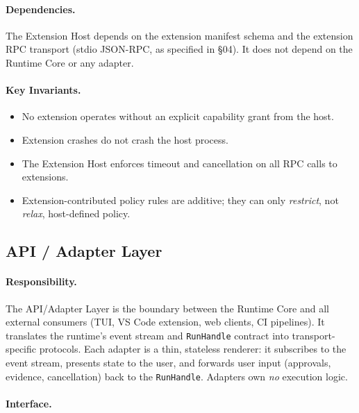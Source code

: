 \paragraph{Dependencies.}
The Extension Host depends on the extension manifest schema and the extension RPC transport
(stdio JSON-RPC, as specified in §04). It does not depend on the Runtime Core or any adapter.

\paragraph{Key Invariants.}
\begin{itemize}
  \item No extension operates without an explicit capability grant from the host.
  \item Extension crashes do not crash the host process.
  \item The Extension Host enforces timeout and cancellation on all RPC calls to extensions.
  \item Extension-contributed policy rules are additive; they can only \emph{restrict}, not
        \emph{relax}, host-defined policy.
\end{itemize}

\subsection{API / Adapter Layer}

\paragraph{Responsibility.}
The API/Adapter Layer is the boundary between the Runtime Core and all external consumers
(TUI, VS Code extension, web clients, CI pipelines). It translates the runtime's event stream
and \texttt{RunHandle} contract into transport-specific protocols. Each adapter is a thin,
stateless renderer: it subscribes to the event stream, presents state to the user, and forwards
user input (approvals, evidence, cancellation) back to the \texttt{RunHandle}. Adapters own
\emph{no} execution logic.

\paragraph{Interface.}

